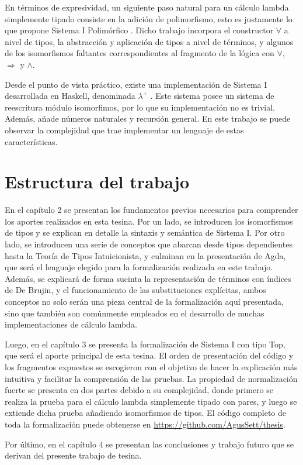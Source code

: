 En términos de expresividad, un siguiente paso natural para un cálculo lambda simplemente tipado consiste en la adición de polimorfismo, esto es justamente lo que propone Sistema I Polimórfico \cite{sip}.
Dicho trabajo incorpora el constructor $\forall$ a nivel de tipos, la abstracción y aplicación de tipos a nivel de términos, y algunos de los isomorfismos faltantes correspondientes al fragmento de la lógica con $\forall$, $\Rightarrow$ y $\wedge$.

Desde el punto de vista práctico, existe una implementación de Sistema I desarrollada en Haskell, denominada $\lambda^+$ \cite{lambda-plus}.
Este sistema posee un sistema de reescritura módulo isomorfimos, por lo que su implementación no es trivial.
Además, añade números naturales y recursión general.
En este trabajo se puede observar la complejidad que trae implementar un lenguaje de estas características.

\section{Estructura del trabajo}

En el capítulo 2 se presentan los fundamentos previos necesarios para comprender los aportes realizados en esta tesina.
Por un lado, se introducen los isomorfismos de tipos y se explican en detalle la sintaxis y semántica de Sistema I.
Por otro lado, se introducen una serie de conceptos que abarcan desde tipos dependientes hasta la Teoría de Tipos Intuicionista, y culminan en la presentación de Agda, que será el lenguaje elegido para la formalización realizada en este trabajo.
Además, se explicará de forma sucinta la representación de términos con índices de De Brujin, y el funcionamiento de las substituciones explícitas, ambos conceptos no solo serán una pieza central de la formalización aquí presentada, sino que también son comúnmente empleados en el desarrollo de muchas implementaciones de cálculo lambda.

Luego, en el capítulo 3 se presenta la formalización de Sistema I con tipo Top, que será el aporte principal de esta tesina.
El orden de presentación del código y los fragmentos expuestos se escogieron con el objetivo de hacer la explicación más intuitiva y facilitar la comprensión de las pruebas.
La propiedad de normalización fuerte se presenta en dos partes debido a su complejidad, donde primero se realiza la prueba para el cálculo lambda simplemente tipado con pares, y luego se extiende dicha prueba añadiendo isomorfismos de tipos.
El código completo de toda la formalización puede obtenerse en \url{https://github.com/AgusSett/thesis}.

Por último, en el capítulo 4 se presentan las conclusiones y trabajo futuro que se derivan del presente trabajo de tesina.